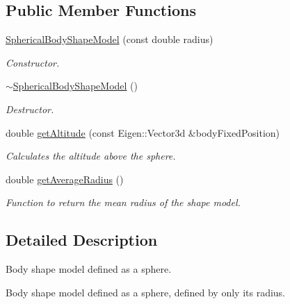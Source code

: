 \subsection*{Public Member Functions}
\begin{DoxyCompactItemize}
\item 
\hyperlink{classtudat_1_1basic__astrodynamics_1_1SphericalBodyShapeModel_a7634ef718c9665546f339c413da6b6e0}{Spherical\+Body\+Shape\+Model} (const double radius)
\begin{DoxyCompactList}\small\item\em Constructor. \end{DoxyCompactList}\item 
\hyperlink{classtudat_1_1basic__astrodynamics_1_1SphericalBodyShapeModel_a6b970b24654c7a96b0f4bc6a78d68b84}{$\sim$\+Spherical\+Body\+Shape\+Model} ()\hypertarget{classtudat_1_1basic__astrodynamics_1_1SphericalBodyShapeModel_a6b970b24654c7a96b0f4bc6a78d68b84}{}\label{classtudat_1_1basic__astrodynamics_1_1SphericalBodyShapeModel_a6b970b24654c7a96b0f4bc6a78d68b84}

\begin{DoxyCompactList}\small\item\em Destructor. \end{DoxyCompactList}\item 
double \hyperlink{classtudat_1_1basic__astrodynamics_1_1SphericalBodyShapeModel_af58a594fa71dfd1791881c8961d571bb}{get\+Altitude} (const Eigen\+::\+Vector3d \&body\+Fixed\+Position)
\begin{DoxyCompactList}\small\item\em Calculates the altitude above the sphere. \end{DoxyCompactList}\item 
double \hyperlink{classtudat_1_1basic__astrodynamics_1_1SphericalBodyShapeModel_a707e6c239b890936d39018762cd0a627}{get\+Average\+Radius} ()
\begin{DoxyCompactList}\small\item\em Function to return the mean radius of the shape model. \end{DoxyCompactList}\end{DoxyCompactItemize}


\subsection{Detailed Description}
Body shape model defined as a sphere. 

Body shape model defined as a sphere, defined by only its radius. 

